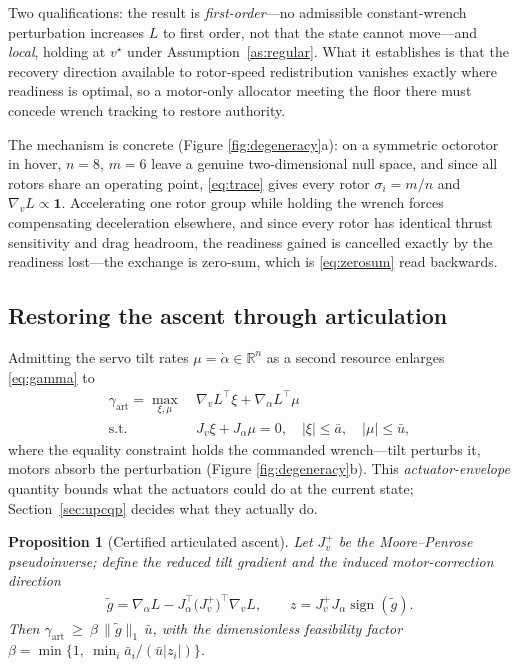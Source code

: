 \documentclass[letter, 10 pt, journal, twoside]{IEEEtran}
\theoremstyle{compact}
\newtheorem{proposition}[theorem]{Proposition}
\begin{document}
Two qualifications: the result is \emph{first-order}---no admissible constant-wrench perturbation increases $L$ to first order, not that the state cannot move---and \emph{local}, holding at $v^\star$ under Assumption~\ref{as:regular}. What it establishes is that the recovery direction available to rotor-speed redistribution vanishes exactly where readiness is optimal, so a motor-only allocator meeting the floor there must concede wrench tracking to restore authority.
 
The mechanism is concrete (Figure \ref{fig:degeneracy}a): on a symmetric octorotor in hover, $n=8$, $m=6$ leave a genuine two-dimensional null space, and since all rotors share an operating point, \eqref{eq:trace} gives every rotor $\sigma_i=m/n$ and $\nabla_v L\propto\mathbf{1}$. Accelerating one rotor group while holding the wrench forces compensating deceleration elsewhere, and since every rotor has identical thrust sensitivity and drag headroom, the readiness gained is cancelled exactly by the readiness lost---the exchange is zero-sum, which is \eqref{eq:zerosum} read backwards.



\subsection{Restoring the ascent through articulation}

Admitting the servo tilt rates $\mu=\dot\alpha\in\mathbb{R}^n$ as a second resource enlarges \eqref{eq:gamma} to
%
\begin{align}
    \gamma_{\mathrm{art}} = \max_{\xi,\mu}\ &\nabla_v L^{\!\top}\xi
    + \nabla_\alpha L^{\!\top}\mu \nonumber\\
    \text{s.t. } & J_v\xi + J_\alpha\mu = 0, \quad
    |\xi|\le\bar a, \quad |\mu|\le\bar u ,
    \label{eq:gart}
\end{align}
%
where the equality constraint holds the commanded wrench---tilt perturbs it, motors absorb the perturbation (Figure \ref{fig:degeneracy}b). This \emph{actuator-envelope} quantity bounds what the actuators could do at the current state; Section~\ref{sec:upcqp} decides what they actually do.
 
\begin{proposition}[Certified articulated ascent]\label{prop:ascent}
Let $J_v^{+}$ be the Moore--Penrose pseudoinverse; define the \emph{reduced tilt gradient} and the induced motor-correction direction
%
\begin{align}
    \tilde g = \nabla_\alpha L - J_\alpha^{\!\top}\big(J_v^{+}\big)^{\!\top}\nabla_v L,
    \qquad
    z = J_v^{+}J_\alpha\operatorname{sign}(\tilde g).
    \label{eq:gtilde}
\end{align}
%
Then $\gamma_{\mathrm{art}}\ \ge\ \beta\,\|\tilde g\|_1\,\bar u$, with the dimensionless feasibility factor $\beta=\min\{1,\ \min_i \bar a_i/(\bar u|z_i|)\}$.
\end{proposition}
 
\end{document}
